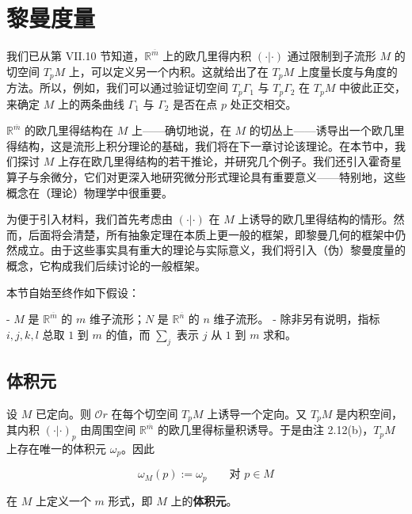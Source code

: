 \section{黎曼度量}

我们已从第 VII.10 节知道，$ \mathbb{R}^{\overline{m}} $ 上的欧几里得内积 $ (\cdot|\cdot) $ 通过限制到子流形 $ M $ 的切空间 $ T_p M $ 上，可以定义另一个内积。这就给出了在 $ T_p M $ 上度量长度与角度的方法。所以，例如，我们可以通过验证切空间 $ T_p\Gamma_1 $ 与 $ T_p\Gamma_2 $ 在 $ T_p M $ 中彼此正交，来确定 $ M $ 上的两条曲线 $ \Gamma_1 $ 与 $ \Gamma_2 $ 是否在点 $ p $ 处正交相交。

$ \mathbb{R}^{\overline{m}} $ 的欧几里得结构在 $ M $ 上——确切地说，在 $ M $ 的切丛上——诱导出一个欧几里得结构，这是流形上积分理论的基础，我们将在下一章讨论该理论。在本节中，我们探讨 $ M $ 上存在欧几里得结构的若干推论，并研究几个例子。我们还引入霍奇星算子与余微分，它们对更深入地研究微分形式理论具有重要意义——特别地，这些概念在（理论）物理学中很重要。

为便于引入材料，我们首先考虑由 $ (\cdot|\cdot) $ 在 $ M $ 上诱导的欧几里得结构的情形。然而，后面将会清楚，所有抽象定理在本质上更一般的框架，即黎曼几何的框架中仍然成立。由于这些事实具有重大的理论与实际意义，我们将引入（伪）黎曼度量的概念，它构成我们后续讨论的一般框架。

本节自始至终作如下假设：

- $ M $ 是 $ \mathbb{R}^{\overline{m}} $ 的 $ m $ 维子流形；$ N $ 是 $ \mathbb{R}^{\overline{n}} $ 的 $ n $ 维子流形。
- 除非另有说明，指标 $ i, j, k, l $ 总取 $ 1 $ 到 $ m $ 的值，而 $ \sum_{j} $ 表示 $ j $ 从 $ 1 $ 到 $ m $ 求和。

\subsection*{体积元}

设 $ M $ 已定向。则 $ \mathcal{O}r $ 在每个切空间 $ T_p M $ 上诱导一个定向。又 $ T_p M $ 是内积空间，其内积 $ (\cdot|\cdot)_p $ 由周围空间 $ \mathbb{R}^{\overline{m}} $ 的欧几里得标量积诱导。于是由注 2.12(b)，$ T_p M $ 上存在唯一的体积元 $ \omega_p $。因此

\[
\omega_M(p) := \omega_p \qquad \text{对 } p \in M
\]

在 $ M $ 上定义一个 $ m $ 形式，即 $ M $ 上的\textbf{体积元}。

